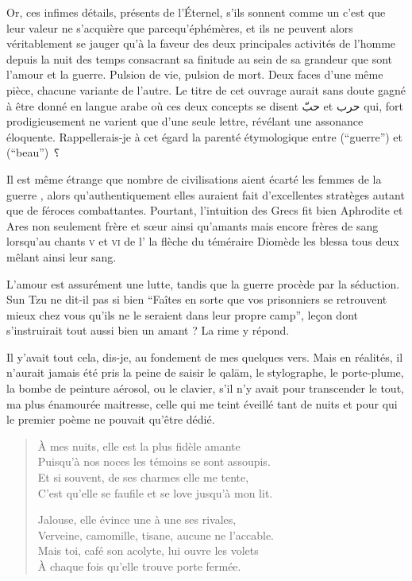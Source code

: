 {	Or, ces infimes détails, présents de l’Éternel, s’ils sonnent comme un  c’est  que leur valeur ne s’acquière que parcequ’éphémères, et ils ne peuvent alors véritablement se jauger qu’à la faveur des deux principales activités de l’homme depuis la nuit des temps consacrant sa finitude au sein de sa grandeur que sont l’amour et la guerre. Pulsion de vie, pulsion de mort. Deux faces d’une même pièce, chacune variante de l’autre. Le titre de cet ouvrage aurait sans doute gagné à être donné en langue arabe où ces deux concepts se disent  \textarabic{حبّ} et  \textarabic{حرب} qui, fort prodigieusement ne varient que d’une seule lettre, révélant une assonance éloquente. Rappellerais-je à cet égard la parenté étymologique entre  (\enquote{guerre}) et  (\enquote{beau}) ⸮

	Il est même étrange que nombre de civilisations aient écarté les femmes de la guerre , alors qu’authentiquement elles auraient fait d’excellentes stratèges autant que de féroces combattantes. Pourtant, l’intuition des Grecs fit bien Aphrodite et Ares non seulement frère et sœur ainsi qu’amants mais encore frères de sang lorsqu’au chants \textsc{v} et \textsc{vi} de l’ la flèche du téméraire Diomède les blessa tous deux mêlant ainsi leur sang.

L’amour est assurément une lutte, tandis que la guerre procède par la séduction. Sun Tzu ne dit-il pas si bien \enquote{Faîtes en sorte que vos prisonniers se retrouvent mieux chez vous qu’ils ne le seraient dans leur propre camp}, leçon dont s’instruirait tout aussi bien un amant ? La rime y répond.

Il y’avait tout cela, dis-je, au fondement de mes quelques vers. Mais en réalités, il n’aurait jamais été pris la peine de saisir le qalām, le stylographe, le porte-plume, la bombe de peinture aérosol, ou le clavier, s’il n’y avait pour transcender le tout, ma plus énamourée maitresse, celle qui me teint éveillé tant de nuits et pour qui le premier poème ne pouvait qu’être dédié.
}

{}
\begin{verse}
À mes nuits, elle est la plus fidèle amante\\
Puisqu’à nos noces les témoins se sont assoupis.\\
Et si souvent, de ses charmes elle me tente,\\
C’est qu’elle se faufile et se love jusqu’à mon lit.

Jalouse, elle évince une à une ses rivales,\\
Verveine, camomille, tisane, aucune ne l’accable.\\
Mais toi, café son acolyte, lui ouvre les volets\\
À chaque fois qu’elle trouve porte fermée.
\end{verse}

